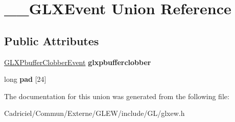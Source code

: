 \hypertarget{union_____g_l_x_event}{\section{\-\_\-\-\_\-\-G\-L\-X\-Event Union Reference}
\label{union_____g_l_x_event}
}
\subsection*{Public Attributes}
\begin{DoxyCompactItemize}
\item 
\hypertarget{union_____g_l_x_event_ada5880e2b424bcb2f60a411aaf713fae}{\hyperlink{struct_g_l_x_pbuffer_clobber_event}{G\-L\-X\-Pbuffer\-Clobber\-Event} {\bfseries glxpbufferclobber}}\label{union_____g_l_x_event_ada5880e2b424bcb2f60a411aaf713fae}

\item 
\hypertarget{union_____g_l_x_event_a1cb8f6e7e77a34d25baf43b3f3bc2d4f}{long {\bfseries pad} \mbox{[}24\mbox{]}}\label{union_____g_l_x_event_a1cb8f6e7e77a34d25baf43b3f3bc2d4f}

\end{DoxyCompactItemize}


The documentation for this union was generated from the following file\-:\begin{DoxyCompactItemize}
\item 
Cadriciel/\-Commun/\-Externe/\-G\-L\-E\-W/include/\-G\-L/glxew.\-h\end{DoxyCompactItemize}
